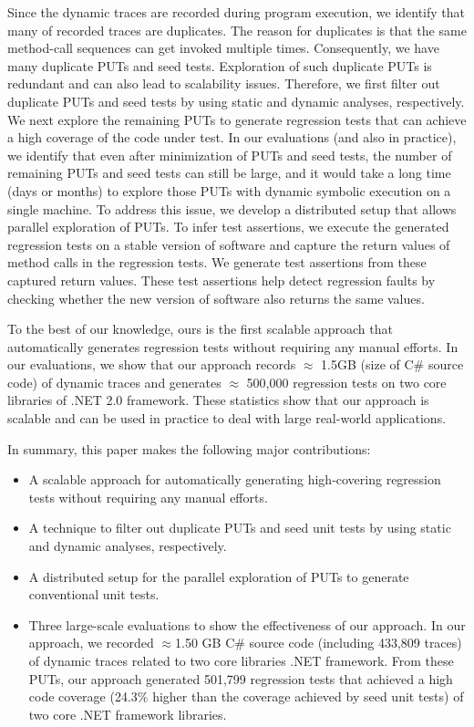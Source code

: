 Since the dynamic traces are recorded during program execution, we identify that many of recorded traces are duplicates. The reason for duplicates is that the same method-call sequences can get invoked multiple times. Consequently, we have many duplicate PUTs and seed tests. Exploration of such duplicate PUTs is redundant and can also lead to scalability issues. Therefore, we first filter out duplicate PUTs and seed tests by using static and dynamic analyses, respectively. We next explore the remaining PUTs to generate regression tests that can achieve a high coverage of the code under test. In our evaluations (and also in practice), we identify that even after minimization of PUTs and seed tests, the number of remaining PUTs and seed tests can still be large, and it would take a long time (days or months) to explore those PUTs with dynamic symbolic execution on a single machine. To address this issue, we develop a distributed setup that allows parallel exploration of PUTs. To infer test assertions, we execute the generated regression tests on a stable version of software and capture the return values of method calls in the regression tests. We generate test assertions from these captured
return values. These test assertions help detect regression faults by checking whether the new version of software also returns the same values.

To the best of our knowledge, ours is the first scalable approach that automatically generates regression tests without requiring any manual efforts. In our evaluations, we show that our approach records $\approx$ 1.5GB (size of C\# source code) of dynamic traces and generates $\approx$ 500,000 regression tests on two core libraries of .NET 2.0 framework. These statistics show that our approach is scalable and can be used in practice to deal with large real-world applications.

In summary, this paper makes the following major contributions:

\begin{itemize}
\item A scalable approach for automatically generating high-covering regression tests without requiring any manual efforts.
\item A technique to filter out duplicate PUTs and seed unit tests by using static and dynamic analyses, respectively.
\item A distributed setup for the parallel exploration of PUTs to generate conventional unit tests.
\item Three large-scale evaluations to show the effectiveness of our approach. In our approach, we recorded $\approx$1.50 GB C\# source code (including 433,809 traces) of dynamic traces related to two core libraries .NET framework. From these PUTs, our approach generated 501,799 regression tests that achieved a high code coverage (24.3\% higher than the coverage achieved by seed unit tests) of two core .NET framework libraries.
\end{itemize}

